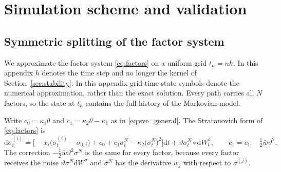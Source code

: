 \documentclass[11pt,a4paper]{article}
\theoremstyle{definition}
\newcommand{\D}{\mathrm{d}}
\begin{document}
\section{Simulation scheme and validation}\label{app:simulation}

\subsection{Symmetric splitting of the factor system}\label{sec:splitting}

We approximate the factor system \eqref{eq:factors} on a uniform grid $t_n=nh$. In this appendix $h$ denotes the time step and no longer the kernel of Section~\ref{sec:stability}. In this appendix grid-time state symbols denote the numerical approximation, rather than the exact solution. Every path carries all $N$ factors, so the state at $t_n$ contains the full history of the Markovian model.

Write $c_0=\kappa_1\theta$ and $c_1=\kappa_2\theta-\kappa_1$ as in \eqref{eq:sve_general}. The Stratonovich form of \eqref{eq:factors} is
\begin{equation}\label{eq:factors_strat}
\D\sigma^{(i)}_t=\Big[-x_i\big(\sigma^{(i)}_t-\sigma_{0,i}\big)+c_0+\tilde c_1\sigma^N_t-\kappa_2\big(\sigma^N_t\big)^2\Big]\D t+\vartheta\sigma^N_t\circ\D W^\sigma_t,\qquad \tilde c_1=c_1-\tfrac12\bar w\vartheta^2 .
\end{equation}
The correction $-\tfrac12\bar w\vartheta^2\sigma^N$ is the same for every factor, because every factor receives the noise $\vartheta\sigma^N\D W^\sigma$ and $\sigma^N$ has the derivative $w_j$ with respect to $\sigma^{(j)}$.
\end{document}
